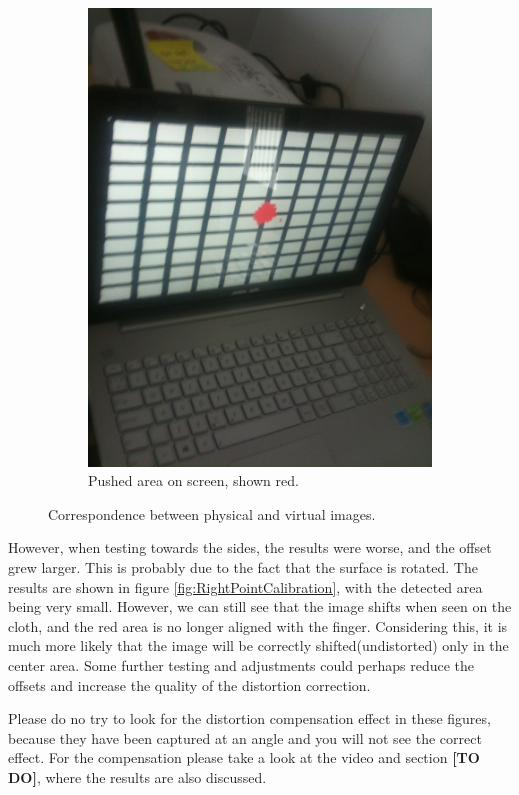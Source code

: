 \documentclass[]{article}
\begin{document}
\begin{figure}[!hbtp]
\begin{subfigure}{.5\textwidth}
  \includegraphics[width=0.9\linewidth]{figures/RedCenterDot.JPG}
  \caption{Pushed area on screen, shown red.}
  \label{fig:RedCenterDot}
\end{subfigure}
\caption{Correspondence between physical and virtual images.}
\label{fig:CenterPointCalibration}
\end{figure}

However, when testing towards the sides, the results were worse, and the offset grew larger. This is probably due to the fact that the surface is rotated. The results are shown in figure \ref{fig:RightPointCalibration}, with the detected area being very small. However, we can still see that the image shifts when seen on the cloth, and the red area is no longer aligned with the finger. Considering this, it is much more likely that the image will be correctly shifted(undistorted) only in the center area. Some further testing and adjustments could perhaps reduce the offsets and increase the quality of the distortion correction.

Please do no try to look for the distortion compensation effect in these figures, because they have been captured at an angle and you will not see the correct effect. For the compensation please take a look at  the video and section \textbf{[TO DO]}, where the results are also discussed.
\end{document}
